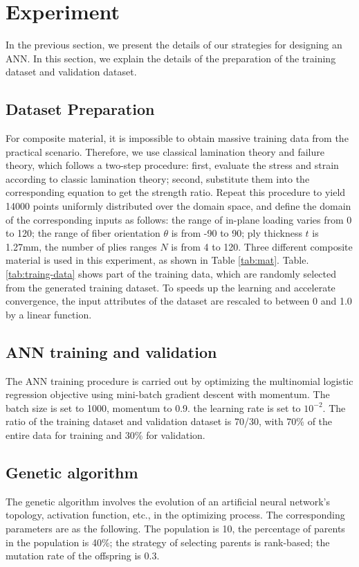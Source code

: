 \section{Experiment}
In the previous section, we present the details of our strategies for designing
an ANN. In this section, we explain the details of the preparation of the
training dataset and validation dataset.

\subsection{Dataset Preparation}
For composite material, it is impossible to obtain massive training data from
the practical scenario. Therefore, we use classical lamination theory and
failure theory, which follows a two-step procedure: first, evaluate the stress
and strain according to classic lamination theory; second, substitute them into
the corresponding equation to get the strength ratio. Repeat this procedure to
yield 14000 points uniformly distributed over the domain space, and define the
domain of the corresponding inputs as follows: the range of in-plane loading
varies from 0 to 120; the range of fiber orientation $\theta$ is from -90 to 90;
ply thickness $t$ is 1.27mm, the number of plies ranges $N$ is from 4 to 120.
Three different composite material is used in this experiment, as shown in Table
\ref{tab:mat}. Table. \ref{tab:traing-data} shows part of the training data, which
are randomly selected from the generated training dataset.  To speeds up the
learning and accelerate convergence, the input attributes of the dataset are
rescaled to between 0 and 1.0 by a linear function.




\subsection{ANN training and validation}
The ANN training procedure is carried out by optimizing the multinomial logistic
regression objective using mini-batch gradient
descent\cite{lecun1989backpropagation} with momentum. The batch size is set to
1000, momentum to 0.9. the learning rate is set to $10^{-2}$. The ratio of the
training dataset and validation dataset is 70/30, with 70\% of the entire data
for training and 30\% for validation.

\subsection{Genetic algorithm}
The genetic algorithm involves the evolution of an artificial neural network’s
topology, activation function, etc., in the optimizing process.  The
corresponding parameters are as the following. The population is 10, the
percentage of parents in the population is 40\%; the strategy of selecting
parents is rank-based; the mutation rate of the offspring is 0.3.

